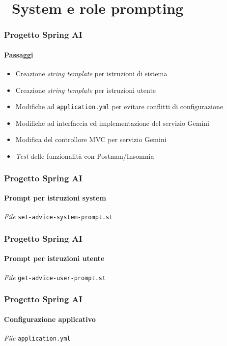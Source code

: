 \section{\faWrench\ System e role prompting} %
\label{sec:spring-ai-gemini-system-role-prompting}
%
\begin{frame}[t,fragile] \frametitle{Progetto Spring AI}
    \framesubtitle{Passaggi}
    {\small
        \begin{itemize}[leftmargin=10pt,align=right]
            \item[\alertedcircled{1}] Creazione \textit{string template} per istruzioni di sistema
            \item[\alertedcircled{2}] Creazione \textit{string template} per istruzioni utente
            \item[\alertedcircled{3}] Modifiche ad \texttt{application.yml} per evitare conflitti di configurazione
            \item[\alertedcircled{4}] Modifiche ad interfaccia ed implementazione del servizio Gemini
            \item[\alertedcircled{5}] Modifica del controllore MVC per servizio Gemini
            \item[\alertedcircled{6}] \textit{Test} delle funzionalità con Postman/Insomnia 
        \end{itemize}
    }
\end{frame}
%
\begin{frame}[t,fragile] \frametitle{Progetto Spring AI}
    \framesubtitle{Prompt per istruzioni system}
        \begin{block}{\textit{File} \texttt{set-advice-system-prompt.st}}
			{\tiny}
    	\end{block}
\end{frame}
%
\begin{frame}[t,fragile] \frametitle{Progetto Spring AI}
    \framesubtitle{Prompt per istruzioni utente}
        \begin{block}{\textit{File} \texttt{get-advice-user-prompt.st}}
			{\tiny}
    	\end{block}
\end{frame}
%
\begin{frame}[t,fragile] \frametitle{Progetto Spring AI}
    \framesubtitle{Configurazione applicativo}
        \begin{block}{\textit{File} \texttt{application.yml}}
			{\tiny}
    	\end{block}
\end{frame}
